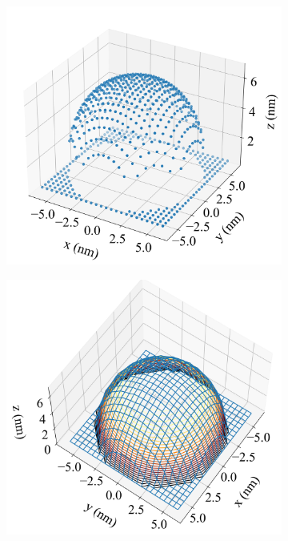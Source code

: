 \begin{figure}[H]
\centering

    \begin{subfigure}{0.49\textwidth}
        \centering
        \caption{ \label{fig: TestRasterScan-Positons} }   
        \includegraphics[width=1\linewidth]{Figures/TestRasterScan-Positons.png}
    \end{subfigure}
    \hfill
    \begin{subfigure}{0.49\textwidth}
        \centering
        \caption{\label{fig: TestRasterScan-Results}  }
        \includegraphics[width=1\linewidth]{Figures/TestRasterScan-Results.png}

\end{subfigure}
\end{figure}
